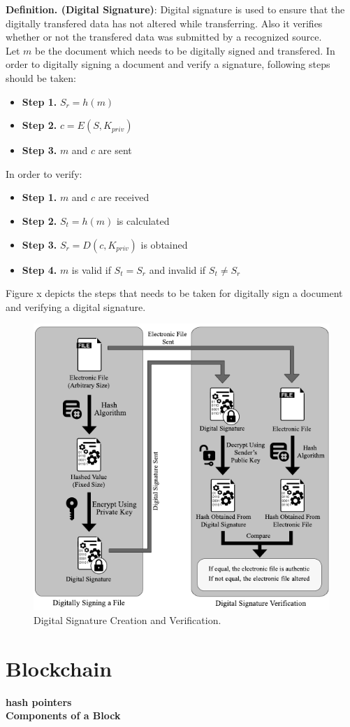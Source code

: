 \textbf{Definition. (Digital Signature)}: Digital signature is used to ensure that the digitally transfered data has not altered while transferring. Also it verifies whether or not the transfered data was submitted by a recognized source. \\
Let $m$ be the document which needs to be digitally signed and transfered. In order to digitally signing a document and verify a signature, following steps should be taken:
\begin{itemize}
	\item \textbf{Step 1.} $S_r = h(m)$
	\item \textbf{Step 2.} $c = E(S,K_{priv})$
	\item \textbf{Step 3.} $m$ and $c$ are sent
\end{itemize}
In order to verify:
\begin{itemize}
	\item \textbf{Step 1.} $m$ and $c$ are received
	\item \textbf{Step 2.} $S_t = h(m)$ is calculated
	\item \textbf{Step 3.} $S_r = D(c,K_{priv})$ is obtained
	\item \textbf{Step 4.} $m$ is valid if $S_t = S_r$ and invalid if $S_t \neq S_r$
\end{itemize}
Figure x depicts the steps that needs to be taken for digitally sign a document and verifying a digital signature.
\begin{figure}[H]
	\label{fig:DigitalSignature}
	\centering
	\includegraphics[width=\textwidth]{figs/digital_signature.pdf}
	\caption{Digital Signature Creation and Verification.}
\end{figure}

\section{Blockchain}
\textbf{hash pointers}\\
\textbf{Components of a Block}\\
